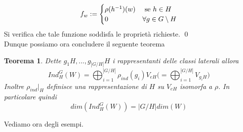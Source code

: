 \documentclass[11pt]{article}
\theoremstyle{plain}
\newtheorem{thm}{Teorema}[section]
\theoremstyle{definition}
\theoremstyle{remark}
\begin{document}
\[f_w:=\begin{cases}
\rho(h^{-1})(w)& \textup{ se } h\in H\\
0& \forall g\in G\setminus H
\end{cases}\]
Si verifica che tale funzione soddisfa le proprietà richieste. \qed \\
Dunque possiamo ora concludere il seguente teorema
\begin{thm} Dette $g_1H,...,g_{|G/H|}H$ i rappresentanti delle classi laterali allora 
\[Ind_H^G(W)=\bigoplus_{i=1}^{|G/H|}\rho_{ind}(g_i)V_{eH}\bigl( =\bigoplus_{i=1}^{|G/H|} V_{g_iH}\bigr) \]
Inoltre $\rho_{ind}|_H$ definisce una rappresentazione di $H$ su $V_{eH}$ isomorfa a $\rho$. In particolare quindi 
\[dim(Ind_H^G(W))=|G/H|dim(W)\] 
\end{thm}
Vediamo ora degli esempi.
\begin{enumerate}

\end{enumerate}
\end{document}
